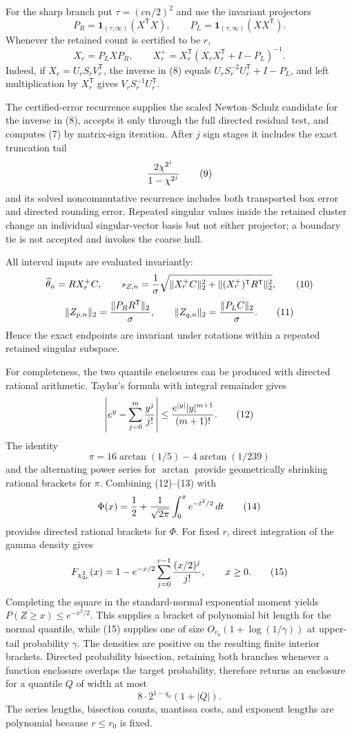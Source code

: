 For the sharp branch put \(\tau=(cn/2)^2\) and use the invariant projectors
\[
P_R=\mathbf1_{(\tau,\infty)}(X^{\mathsf T}X),
\qquad
P_L=\mathbf1_{(\tau,\infty)}(XX^{\mathsf T}).                         \tag{7}
\]
Whenever the retained count is certified to be \(r\),
\[
X_r=P_LXP_R,
\qquad
X_r^+=X_r^{\mathsf T}(X_rX_r^{\mathsf T}+I-P_L)^{-1}.                \tag{8}
\]
Indeed, if \(X_r=U_rS_rV_r^{\mathsf T}\), the inverse in (8) equals
\(U_rS_r^{-2}U_r^{\mathsf T}+I-P_L\), and left multiplication by
\(X_r^{\mathsf T}\) gives \(V_rS_r^{-1}U_r^{\mathsf T}\).

The certified-error recurrence supplies the scaled Newton--Schulz candidate for
the inverse in (8), accepts it only through the full directed residual test, and
computes (7) by matrix-sign iteration.  After \(j\) sign stages it includes the
exact truncation tail
\[
{2\chi^{2^j}\over1-\chi^{2^j}}                                      \tag{9}
\]
and its solved noncommutative recurrence includes both transported box error and
directed rounding error.  Repeated singular values inside the retained cluster
change an individual singular-vector basis but not either projector; a boundary
tie is not accepted and invokes the coarse hull.

All interval inputs are evaluated invariantly:
\[
\widehat\theta_n=RX_r^+C,
\qquad
s_{Z,n}={1\over\sigma}
\sqrt{\|X_r^+C\|_2^2+
\|(X_r^+)^{\mathsf T}R^{\mathsf T}\|_2^2},                            \tag{10}
\]
\[
\|Z_{p,n}\|_2={\|P_RR^{\mathsf T}\|_2\over\sigma},
\qquad
\|Z_{q,n}\|_2={\|P_LC\|_2\over\sigma}.                             \tag{11}
\]
Hence the exact endpoints are invariant under rotations within a repeated
retained singular subspace.

For completeness, the two quantile enclosures can be produced with directed
rational arithmetic.  Taylor's formula with integral remainder gives
\[
\left|e^y-\sum_{j=0}^m{y^j\over j!}\right|
\le {e^{|y|}|y|^{m+1}\over(m+1)!}.                                   \tag{12}
\]
The identity
\[
\pi=16\arctan(1/5)-4\arctan(1/239)                                  \tag{13}
\]
and the alternating power series for \(\arctan\) provide geometrically
shrinking rational brackets for \(\pi\).  Combining (12)--(13) with
\[
\Phi(x)=\frac12+{1\over\sqrt{2\pi}}
\int_0^x e^{-t^2/2}\,dt                                             \tag{14}
\]
provides directed rational brackets for \(\Phi\).  For fixed \(r\), direct
integration of the gamma density gives
\[
F_{\chi^2_{2r}}(x)
=1-e^{-x/2}\sum_{j=0}^{r-1}{(x/2)^j\over j!},\qquad x\ge0.           \tag{15}
\]
Completing the square in the standard-normal exponential moment yields
\(P(Z\ge x)\le e^{-x^2/2}\).  This supplies a bracket of polynomial bit length
for the normal quantile, while (15) supplies one of size
\(O_{r_0}(1+\log(1/\gamma))\) at upper-tail probability \(\gamma\).  The
densities are positive on the resulting finite interior brackets.  Directed
probability bisection, retaining both branches whenever a function enclosure
overlaps the target probability, therefore returns an enclosure for a quantile
\(Q\) of width at most
\[
8\cdot2^{1-q_n}(1+|Q|).                                               \tag{16}
\]
The series lengths, bisection counts, mantissa costs, and exponent lengths are
polynomial because \(r\le r_0\) is fixed.

